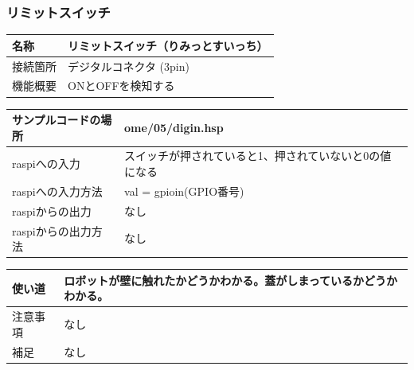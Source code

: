 \subsubsection{リミットスイッチ}\label{lmswitch}
\begin{table}[H]
	\begin{tabular}{|p{\colF}|p{\colG}|}	\hline
	名称 & リミットスイッチ（りみっとすいっち）\\ \hline
	接続箇所 & デジタルコネクタ (3pin)\\ \hline
	機能概要 & ONとOFFを検知する\\ \hline
  \end{tabular}
\end{table}

\begin{table}[H]
	\begin{tabular}{|p{\colF}|p{\colG}|}	\hline
	サンプルコードの場所 & ome/05/digin.hsp\\ \hline
	raspiへの入力 & スイッチが押されていると1、押されていないと0の値になる\\ \hline
	raspiへの入力方法 & val = gpioin(GPIO番号)\\ \hline
	raspiからの出力 & なし\\ \hline
	raspiからの出力方法 & なし\\ \hline
  \end{tabular}
\end{table}

\begin{table}[H]
	\begin{tabular}{|p{\colF}|p{\colG}|} \hline
	使い道 & ロボットが壁に触れたかどうかわかる。蓋がしまっているかどうかわかる。\\ \hline
	注意事項 & なし\\ \hline
	補足 & なし\\ \hline
  \end{tabular}
\end{table}

